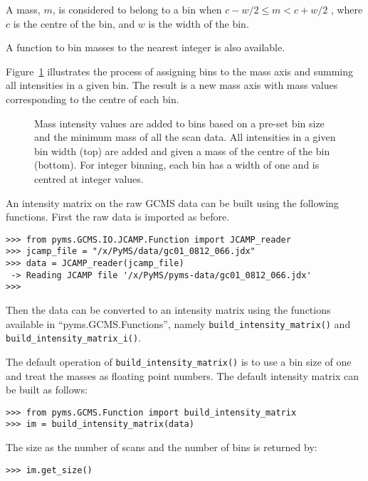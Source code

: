 A mass, $m$, is considered to belong to a bin when
$c - w/2 \le m < c + w/2$
, where $c$ is the centre of the bin, and $w$ is
the width of the bin.

A function to bin masses to the nearest integer is also available.

Figure~\ref{fig:binning} illustrates the process of assigning bins to the mass
axis and summing all intensities in a given bin. The result is a new mass axis
with mass values corresponding to the centre of each bin.

\begin{figure}[htp]
\begin{center}
\caption{Mass intensity values are added to bins based on a pre-set bin size and
the minimum mass of all the scan data. All intensities in a given bin width
(top) are added and given a mass of the centre of the bin (bottom). For integer
binning, each bin has a width of one and is centred at integer values.}
\label{fig:binning}
\end{center}
\end{figure}


An intensity matrix on the raw GCMS data can be built using the following
functions. First the raw data is imported as before.

\begin{verbatim}
>>> from pyms.GCMS.IO.JCAMP.Function import JCAMP_reader
>>> jcamp_file = "/x/PyMS/data/gc01_0812_066.jdx"
>>> data = JCAMP_reader(jcamp_file)
 -> Reading JCAMP file '/x/PyMS/pyms-data/gc01_0812_066.jdx'
>>>
\end{verbatim}

\noindent
Then the data can be converted to an intensity matrix using the functions
available in ``pyms.GCMS.Functions'', namely {\tt build\_intensity\_matrix()}
and {\tt build\_intensity\_matrix\_i()}.

The default operation of {\tt build\_intensity\_matrix()} is to use a bin size
of one and treat the masses as floating point numbers. The default intensity
matrix can be built as follows:

\begin{verbatim}
>>> from pyms.GCMS.Function import build_intensity_matrix
>>> im = build_intensity_matrix(data)
\end{verbatim}

The size as the number of scans and the number of bins is returned by:
\begin{verbatim}
>>> im.get_size()
\end{verbatim}


